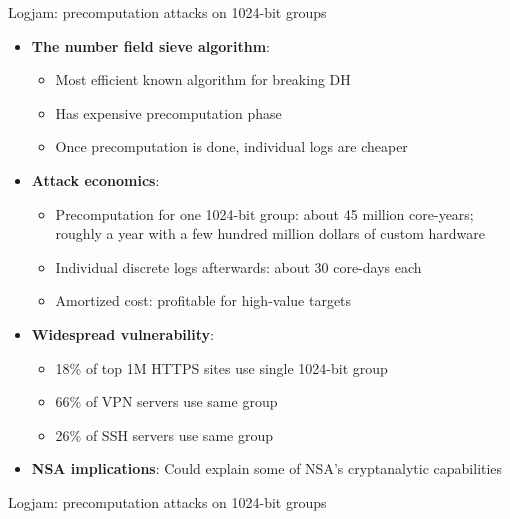 \ifdefined\PRESENTATION\else\PassOptionsToClass{handout}{beamer}\fi\documentclass[aspectratio=169, lualatex]{beamer}
\begin{document}
\begin{frame}{Logjam: precomputation attacks on 1024-bit groups}
	\begin{itemize}
		\item \textbf{The number field sieve algorithm}:
		      \begin{itemize}
			      \item Most efficient known algorithm for breaking DH
			      \item Has expensive precomputation phase
			      \item Once precomputation is done, individual logs are cheaper
		      \end{itemize}
		\item \textbf{Attack economics}:
		      \begin{itemize}
			      \item Precomputation for one 1024-bit group: about 45 million core-years; roughly a year with a few hundred million dollars of custom hardware
			      \item Individual discrete logs afterwards: about 30 core-days each
			      \item Amortized cost: profitable for high-value targets
		      \end{itemize}
		\item \textbf{Widespread vulnerability}:
		      \begin{itemize}
			      \item 18\% of top 1M HTTPS sites use single 1024-bit group
			      \item 66\% of VPN servers use same group
			      \item 26\% of SSH servers use same group
		      \end{itemize}
		\item \textbf{NSA implications}: Could explain some of NSA's cryptanalytic capabilities
	\end{itemize}
\end{frame}

\begin{frame}{Logjam: precomputation attacks on 1024-bit groups}
\end{frame}
\end{document}
